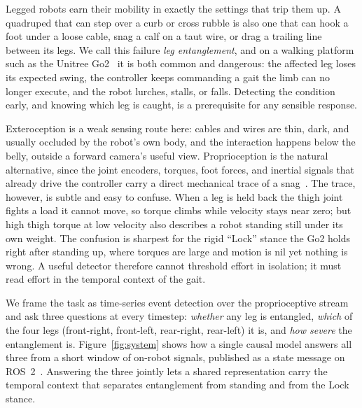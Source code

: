 \documentclass[conference]{IEEEtran}
\begin{document}
Legged robots earn their mobility in exactly the settings that trip them up. A quadruped that can step over a curb or cross rubble is also one that can hook a foot under a loose cable, snag a calf on a taut wire, or drag a trailing line between its legs. We call this failure \emph{leg entanglement}, and on a walking platform such as the Unitree Go2~\cite{unitree_go2} it is both common and dangerous: the affected leg loses its expected swing, the controller keeps commanding a gait the limb can no longer execute, and the robot lurches, stalls, or falls. Detecting the condition early, and knowing which leg is caught, is a prerequisite for any sensible response.

Exteroception is a weak sensing route here: cables and wires are thin, dark, and usually occluded by the robot's own body, and the interaction happens below the belly, outside a forward camera's useful view. Proprioception is the natural alternative, since the joint encoders, torques, foot forces, and inertial signals that already drive the controller carry a direct mechanical trace of a snag~\cite{hwangbo2019learning,lee2020learning,camurri2017contact}. The trace, however, is subtle and easy to confuse. When a leg is held back the thigh joint fights a load it cannot move, so torque climbs while velocity stays near zero; but high thigh torque at low velocity also describes a robot standing still under its own weight. The confusion is sharpest for the rigid ``Lock'' stance the Go2 holds right after standing up, where torques are large and motion is nil yet nothing is wrong. A useful detector therefore cannot threshold effort in isolation; it must read effort in the temporal context of the gait.

We frame the task as time-series event detection over the proprioceptive stream and ask three questions at every timestep: \emph{whether} any leg is entangled, \emph{which} of the four legs (front-right, front-left, rear-right, rear-left) it is, and \emph{how severe} the entanglement is. Figure~\ref{fig:system} shows how a single causal model answers all three from a short window of on-robot signals, published as a state message on ROS~2~\cite{macenski2022ros2}. Answering the three jointly lets a shared representation carry the temporal context that separates entanglement from standing and from the Lock stance.
\end{document}
